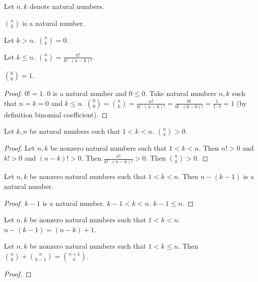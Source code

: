 \documentclass{article}
\begin{document}
\begin{forthel}

Let $n, k$ denote natural numbers.
\begin{signature}
$\binom{n}{k}$ is a natural number.
\end{signature}


\begin{axiom}
Let $k > n$. $\binom{n}{k} = 0$.
\end{axiom}
    
\begin{axiom}
Let $k \leq n$. $\binom{n}{k} = \frac{n!}{k! \cdot (n-k)!}$.
\end{axiom}

\begin{lemma}
$\binom{0}{0} = 1$.
\end{lemma}
\begin{proof}
$0! = 1$.
$0$ is a natural number and $0 \leq 0$.
Take natural numbers $n,k$ such that $n=k=0$ and $k\leq n$.
$\binom{0}{0} = \binom{n}{k} = \frac{n!}{k! \cdot (n-k)!} = 
\frac{0!}{0! \cdot (0-0)!} = \frac{1}{1 \cdot 1} = 1$
(by definition binomial coefficient).
\end{proof}


\begin{theorem}
Let $k,n$ be natural numbers such that $1 < k < n$.
$\binom{n}{k} > 0$. 
\end{theorem}
\begin{proof}
Let $n,k$ be nonzero natural numbers such that $1 < k < n$.
Then $n! > 0$ and $k! > 0$ and $(n-k)! > 0$. 
Then $\frac{n!}{k! \cdot (n-k)!} > 0$. 
Then $\binom{n}{k} > 0$. 
\end{proof}

\begin{lemma}
Let $n,k$ be nonzero natural numbers such that $1 < k < n$.
Then $n-(k-1)$ is a natural number.
\end{lemma}
\begin{proof}
$k-1$ is a natural number. $k-1 < k < n$. $k-1 \leq n$.
\end{proof}
  
\begin{lemma}
Let $n,k$ be nonzero natural numbers such that $1 < k < n$.
$n-(k-1) = (n-k)+1$.
\end{lemma}
  
\begin{theorem}
Let $n,k$ be nonzero natural numbers such that $1 < k \leq n$.
Then $\binom{n}{k} + \binom{n}{k-1} = \binom{n+1}{k}$.
\end{theorem}
\begin{proof}
	

\end{proof}
\end{forthel}
\end{document}
